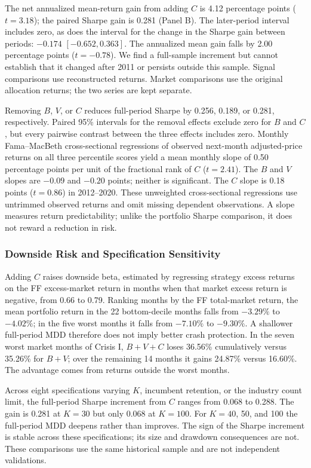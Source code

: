 \documentclass[letterpaper,journal]{IEEEtran}
\begin{document}
The net annualized mean-return gain from adding $C$ is 4.12 percentage points ($t=3.18$); the paired Sharpe gain is 0.281 (Panel B). The later-period interval includes zero, as does the interval for the change in the Sharpe gain between periods: $-0.174$ $[-0.652,0.363]$. The annualized mean gain falls by 2.00 percentage points ($t=-0.78$). We find a full-sample increment but cannot establish that it changed after 2011 or persists outside this sample. Signal comparisons use reconstructed returns. Market comparisons use the original allocation returns; the two series are kept separate.

Removing $B$, $V$, or $C$ reduces full-period Sharpe by 0.256, 0.189, or 0.281, respectively. Paired 95\% intervals for the removal effects exclude zero for $B$ and $C$, but every pairwise contrast between the three effects includes zero. Monthly Fama--MacBeth cross-sectional regressions of observed next-month adjusted-price returns on all three percentile scores \cite{famamacbeth} yield a mean monthly slope of 0.50 percentage points per unit of the fractional rank of $C$ ($t=2.41$). The $B$ and $V$ slopes are $-0.09$ and $-0.20$ points; neither is significant. The $C$ slope is 0.18 points ($t=0.86$) in 2012--2020. These unweighted cross-sectional regressions use untrimmed observed returns and omit missing dependent observations. A slope measures return predictability; unlike the portfolio Sharpe comparison, it does not reward a reduction in risk.

\subsubsection{Downside Risk and Specification Sensitivity}
Adding $C$ raises downside beta, estimated by regressing strategy excess returns on the FF excess-market return in months when that market excess return is negative, from 0.66 to 0.79. Ranking months by the FF total-market return, the mean portfolio return in the 22 bottom-decile months falls from $-3.29\%$ to $-4.02\%$; in the five worst months it falls from $-7.10\%$ to $-9.30\%$. A shallower full-period MDD therefore does not imply better crash protection. In the seven worst market months of Crisis I, $B+V+C$ loses 36.56\% cumulatively versus 35.26\% for $B+V$; over the remaining 14 months it gains 24.87\% versus 16.60\%. The advantage comes from returns outside the worst months.

Across eight specifications varying $K$, incumbent retention, or the industry count limit, the full-period Sharpe increment from $C$ ranges from 0.068 to 0.288. The gain is 0.281 at $K=30$ but only 0.068 at $K=100$. For $K=40$, 50, and 100 the full-period MDD deepens rather than improves. The sign of the Sharpe increment is stable across these specifications; its size and drawdown consequences are not. These comparisons use the same historical sample and are not independent validations.
\end{document}
